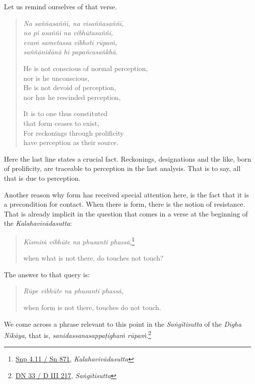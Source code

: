 Let us remind ourselves of that verse.

\begin{quote}
\emph{Na saññasaññī, na visaññasaññī,}\\
\emph{no pi asaññī na vibhūtasaññī,}\\
\emph{evaṁ sametassa vibhoti rūpaṁ,}\\
\emph{saññānidānā hi papañcasaṅkhā.}

He is not conscious of normal perception,\\
\vin nor is he unconscious,\\
He is not devoid of perception,\\
\vin nor has he rescinded perception,

\clearpage

It is to one thus constituted\\
\vin that form ceases to exist,\\
For reckonings through prolificity\\
\vin have perception as their source.
\end{quote}

Here the last line states a crucial fact. Reckonings, designations and the like, born of prolificity, are traceable to perception in the last analysis. That is to say, all that is due to perception.

Another reason why form has received special attention here, is the fact that it is a precondition for contact. When there is form, there is the notion of resistance. That is already implicit in the question that comes in a verse at the beginning of the \emph{Kalahavivādasutta}:

\begin{quote}
\emph{Kismiṁ vibhūte na phusanti phassā},\footnote{\href{https://suttacentral.net/snp4.11/pli/ms}{Snp 4.11 / Sn 871}, \emph{Kalahavivādasutta}}

when what is not there, do touches not touch?
\end{quote}

The answer to that query is:

\begin{quote}
\emph{Rūpe vibhūte na phusanti phassā},

when form is not there, touches do not touch.
\end{quote}

We come across a phrase relevant to this point in the \emph{Saṅgītisutta} of the \emph{Dīgha Nikāya}, that is, \emph{sanidassanasappaṭighaṁ rūpaṁ}.\footnote{\href{https://suttacentral.net/dn33/pli/ms}{DN 33 / D III 217}, \emph{Saṅgītisutta}}

